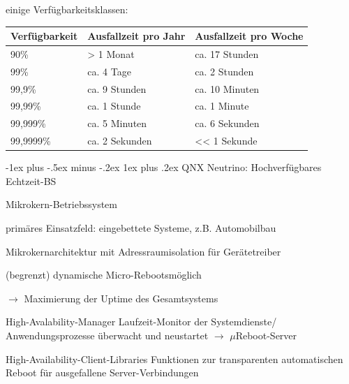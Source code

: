 \documentclass[a4paper]{article}
\makeatletter
\renewcommand{\subsubsection}{\@startsection{subsubsection}{3}{0mm}%
 {-1ex plus -.5ex minus -.2ex}%
 {1ex plus .2ex}%
 {\normalfont\small\bfseries}}
\makeatother
\begin{document}
\begin{multicols}{3}
    einige Verfügbarkeitsklassen:
    \begin{tabular}{l|l|l}
        Verfügbarkeit & Ausfallzeit pro Jahr   & Ausfallzeit pro Woche          \\\hline
        90\%          & \textgreater{} 1 Monat & ca. 17 Stunden                 \\
        99\%          & ca. 4 Tage             & ca. 2 Stunden                  \\
        99,9\%        & ca. 9 Stunden          & ca. 10 Minuten                 \\
        99,99\%       & ca. 1 Stunde           & ca. 1 Minute                   \\
        99,999\%      & ca. 5 Minuten          & ca. 6 Sekunden                 \\
        99,9999\%     & ca. 2 Sekunden         & \textless\textless{} 1 Sekunde
    \end{tabular}

    \subsubsection{QNX Neutrino: Hochverfügbares Echtzeit-BS}
    \begin{itemize*}
        \item Mikrokern-Betriebssystem
        \item primäres Einsatzfeld: eingebettete Systeme, z.B. Automobilbau
        \item Mikrokernarchitektur mit Adressraumisolation für Gerätetreiber
        \item (begrenzt) dynamische Micro-Rebootsmöglich
        \item[$\rightarrow$] Maximierung der Uptime des Gesamtsystems
    \end{itemize*}
    \begin{description*}
        \item[High-Avalability-Manager] Laufzeit-Monitor der Systemdienste/ Anwendungsprozesse überwacht und neustartet $\rightarrow$ $\mu$Reboot-Server
        \item[High-Availability-Client-Libraries] Funktionen zur transparenten automatischen Reboot für ausgefallene Server-Verbindungen
    \end{description*}

    \pagebreak

\end{multicols}
\end{document}
